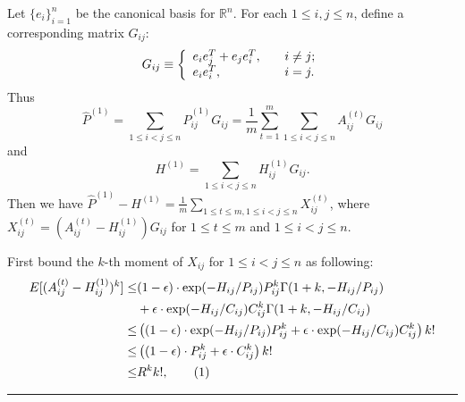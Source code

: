 \documentclass[a4paper]{article}
\newenvironment{proof}{{\bf Proof:  }}{\hfill\rule{2mm}{2mm}}
\renewcommand{\hat}{\widehat}
\begin{document}
\begin{proof}
Let $\{e_i\}_{i=1}^n$ be the canonical basis for $\mathbb{R}^n$. For each $1 \le i, j \le n$, define a corresponding matrix $G_{ij}$:
\[
    G_{ij} \equiv \left\{
    \begin{array}{l l}
        e_i e_j^T + e_j e_i^T, \quad & i \ne j;\\
        e_i e_i^T, \quad & i = j.
    \end{array}
    \right.
\]
Thus
\[
\hat{P}^{(1)} = \sum_{1 \le i < j \le n} \hat{P}^{(1)}_{ij} G_{ij} = \frac{1}{m}\sum_{t=1}^m \sum_{1 \le i < j \le n} A^{(t)}_{ij} G_{ij}
\]
and
\[
H^{(1)} = \sum_{1 \le i < j \le n} H^{(1)}_{ij} G_{ij}.
\]
Then we have $\hat{P}^{(1)} - H^{(1)} = \frac{1}{m} \sum_{1 \le t \le m, 1 \le i < j \le n} X_{ij}^{(t)}$, where $X_{ij}^{(t)} = \left( A^{(t)}_{ij} - H^{(1)}_{ij} \right) G_{ij}$ for $1 \le t \le m$ and $1 \le i < j \le n$.

First bound the $k$-th moment of $X_{ij}$ for $1 \le i < j \le n$ as following:
\begin{align*}
	E[(A^{(t)}_{ij} - H^{(1)}_{ij})^k]
    \le & (1-\epsilon) \cdot \exp(-H_{ij}/P_{ij}) P_{ij}^k \Gamma(1+k, -H_{ij}/P_{ij}) \\
    & + \epsilon \cdot \exp(-H_{ij}/C_{ij}) C_{ij}^k \Gamma(1+k, -H_{ij}/C_{ij}) \\
    \le & \left( (1-\epsilon) \cdot \exp(-H_{ij}/P_{ij}) P_{ij}^k + \epsilon \cdot \exp(-H_{ij}/C_{ij}) C_{ij}^k \right) k! \\
    \le & \left( (1-\epsilon) \cdot P_{ij}^k + \epsilon \cdot C_{ij}^k \right) k! \\
    \le & R^k k!,
    \stepcounter{equation}\tag{\theequation}\label{eqn:expectpdiffqpowerkL1}
\end{align*}


\end{proof}
\end{document}
